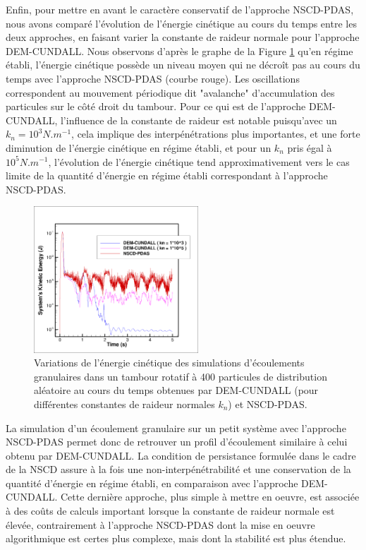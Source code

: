 Enfin, pour mettre en avant le caractère conservatif de l'approche NSCD-PDAS, nous avons comparé l'évolution de l'énergie cinétique au cours du temps entre les deux approches, en faisant varier la constante de raideur normale pour l'approche DEM-CUNDALL. Nous observons d'après le graphe de la Figure \ref{fig134} qu'en régime établi, l'énergie cinétique possède un niveau moyen qui ne décroît pas au cours du temps avec l'approche NSCD-PDAS (courbe rouge). Les oscillations correspondent au mouvement périodique dit "avalanche" d'accumulation des particules sur le côté droit du tambour. Pour ce qui est de l'approche DEM-CUNDALL, l'influence de la constante de raideur est notable puisqu'avec un $k_n = 10^3 N.m^{-1}$, cela implique des interpénétrations plus importantes, et une forte diminution de l'énergie cinétique en régime établi, et pour un $k_n$ pris égal à $10^5  N.m^{-1}$, l'évolution de l'énergie cinétique tend approximativement vers le cas limite de la quantité d'énergie en régime établi correspondant à l'approche NSCD-PDAS.

\begin{figure}[!h]
  \centering
    \includegraphics[width=0.55\textwidth]{chapitres/chapitre_4/figures/ec_tambour_400.png}
    \caption{\centering Variations de l'énergie cinétique des simulations d'écoulements granulaires dans un tambour rotatif à 400 particules de distribution aléatoire au cours du temps obtenues par DEM-CUNDALL (pour différentes constantes de raideur normales $k_n$) et NSCD-PDAS.}\label{fig134}
\end{figure}

La simulation d'un écoulement granulaire sur un petit système avec l'approche NSCD-PDAS permet donc de retrouver un profil d'écoulement similaire à celui obtenu par DEM-CUNDALL. La condition de persistance formulée dans le cadre de la NSCD assure à la fois une non-interpénétrabilité et une conservation de la quantité d'énergie en régime établi, en comparaison avec l'approche DEM-CUNDALL. Cette dernière approche, plus simple à mettre en oeuvre, est associée à des coûts de calculs important lorsque la constante de raideur normale est élevée, contrairement à l'approche NSCD-PDAS dont la mise en oeuvre algorithmique est certes plus complexe, mais dont la stabilité est plus étendue. 

